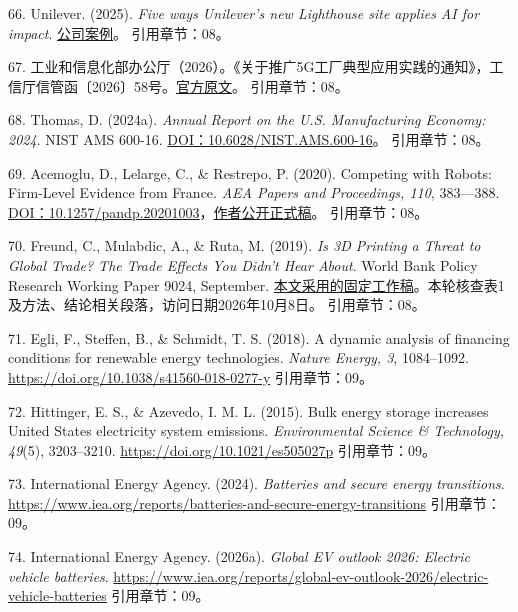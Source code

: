 \documentclass[UTF8,fontset=windows,12pt,a4paper,oneside,openany]{ctexbook}
\begin{document}
66. Unilever. (2025). \emph{Five ways Unilever’s new Lighthouse site applies AI for impact}. \href{https://www.unilever.com/news/news-search/2025/five-ways-unilevers-new-lighthouse-site-applies-ai-for-impact/}{公司案例}。
引用章节：08。

67. 工业和信息化部办公厅（2026）。《关于推广5G工厂典型应用实践的通知》，工信厅信管函〔2026〕58号。\href{https://www.miit.gov.cn/ztzl/rdzt/gyhlw/wjfb/art/2026/art_6b35987d001445d49487650795eac294.html}{官方原文}。
引用章节：08。

68. Thomas, D. (2024a). \emph{Annual Report on the U.S. Manufacturing Economy: 2024}. NIST AMS 600-16. \href{https://doi.org/10.6028/NIST.AMS.600-16}{DOI：10.6028/NIST.AMS.600-16}。
引用章节：08。

69. Acemoglu, D., Lelarge, C., \& Restrepo, P. (2020). Competing with Robots: Firm-Level Evidence from France. \emph{AEA Papers and Proceedings, 110}, 383—388. \href{https://doi.org/10.1257/pandp.20201003}{DOI：10.1257/pandp.20201003}，\href{https://economics.mit.edu/sites/default/files/publications/Competing\%20with\%20Robots\%20-\%20Firm-Level\%20Evidence\%20from\%20F.pdf}{作者公开正式稿}。
引用章节：08。

70. Freund, C., Mulabdic, A., \& Ruta, M. (2019). \emph{Is 3D Printing a Threat to Global Trade? The Trade Effects You Didn’t Hear About}. World Bank Policy Research Working Paper 9024, September. \href{https://documents1.worldbank.org/curated/en/152701569432061451/pdf/Is-3D-Printing-a-Threat-to-Global-Trade-The-Trade-Effects-You-Didnt-Hear-About.pdf}{本文采用的固定工作稿}。本轮核查表1及方法、结论相关段落，访问日期2026年10月8日。
引用章节：08。

71. Egli, F., Steffen, B., \& Schmidt, T. S. (2018). A dynamic analysis of financing conditions for renewable energy technologies. \emph{Nature Energy, 3}, 1084–1092. \url{https://doi.org/10.1038/s41560-018-0277-y}
引用章节：09。

72. Hittinger, E. S., \& Azevedo, I. M. L. (2015). Bulk energy storage increases United States electricity system emissions. \emph{Environmental Science \& Technology, 49}(5), 3203–3210. \url{https://doi.org/10.1021/es505027p}
引用章节：09。

73. International Energy Agency. (2024). \emph{Batteries and secure energy transitions}. \url{https://www.iea.org/reports/batteries-and-secure-energy-transitions}
引用章节：09。

74. International Energy Agency. (2026a). \emph{Global EV outlook 2026: Electric vehicle batteries}. \url{https://www.iea.org/reports/global-ev-outlook-2026/electric-vehicle-batteries}
引用章节：09。
\end{document}
